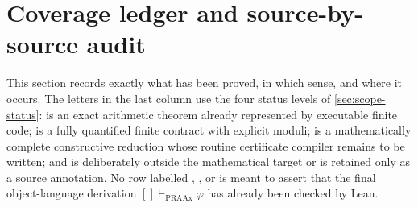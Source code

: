 \section{Coverage ledger and source-by-source audit}\label{sec:coverage-audit}

This section records exactly what has been proved, in which sense, and where it
occurs.  The letters in the last column use the four status levels of
\cref{sec:scope-status}: \statusA{} is an exact arithmetic theorem already
represented by executable finite code; \statusB{} is a fully quantified
finite contract with explicit moduli; \statusC{} is a mathematically complete
constructive reduction whose routine certificate compiler remains to be
written; and \statusD{} is deliberately outside the mathematical target or is
retained only as a source annotation.  No row labelled \statusA, \statusB, or
\statusC{} is meant to assert that the final object-language derivation
\( []\vdash_{\mathrm{PRAAx}}\varphi\) has already been checked by Lean.

